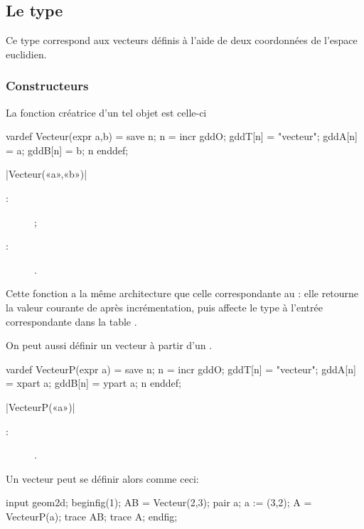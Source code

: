 \documentclass[a4paper,french]{article}
\begin{document}
\subsection{Le type }

Ce type correspond aux vecteurs
définis à l'aide de deux coordonnées de l'espace euclidien.

\subsubsection{Constructeurs}

La fonction
créatrice d'un tel objet est celle-ci
%
\begin{mpcode}
vardef Vecteur(expr a,b) =
  save n; n = incr gddO;
  gddT[n] = "vecteur"; gddA[n] = a; gddB[n] = b; n
enddef;
\end{mpcode}

\begin{colourband}
\macro|Vecteur(«a»,«b»)|
\begin{description}
  \item[:]  ;
  \item[:] .
\end{description}
\end{colourband}
\bigskip

Cette fonction a la même architecture que celle correspondante au
 : elle retourne la valeur courante de 
après incrémentation, puis affecte le type  à
l'entrée correspondante dans la table .

On peut aussi définir un vecteur à partir d'un  \MP.
\begin{mpcode}
vardef VecteurP(expr a) =
  save n; n = incr gddO;
  gddT[n] = "vecteur"; gddA[n] = xpart a; gddB[n] = ypart a; n
enddef;
\end{mpcode}

\begin{colourband}
\macro|VecteurP(«a»)|
\begin{description}
  \item[:] .
\end{description}
\end{colourband}
\bigskip

Un vecteur peut se définir alors comme ceci:
\begin{ExempleMP}
input geom2d;
beginfig(1);
AB = Vecteur(2,3);
pair a;
a := (3,2);
A = VecteurP(a);
trace AB;
trace A;
endfig;
\end{ExempleMP}
\end{document}
